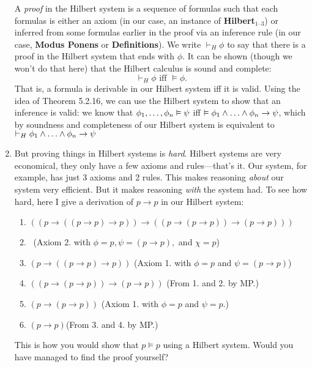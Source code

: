 \begin{enumerate}[\thesection.1]
\begin{description}
		\end{description}
	A \emph{proof} in the Hilbert system is a sequence of formulas such that each formulas is either an axiom (in our case, an instance of \textbf{Hilbert}$_\text{1--3}$) or inferred from some formulas earlier in the proof via an inference rule (in our case, \textbf{Modus Ponens}  or \textbf{Definitions}). We write $\vdash_H\phi$ to say that there is a proof in the Hilbert system that ends with $\phi$. It can be shown (though we won't do that here) that the Hilbert calculus is sound and complete:
	 \[\vdash_H\phi\text{ iff }\vDash\phi.\]
	 That is, a formula is derivable in our Hilbert system iff it is valid. Using the idea of Theorem 5.2.16, we can use the Hilbert system to show that an inference is valid: we know that $\phi_1, \mathellipsis,\phi_n\vDash \psi$ iff $\vDash \phi_1\land \mathellipsis\land \phi_n\to\psi$, which by soundness and completeness of our Hilbert system is equivalent to $\vdash_H \phi_1\land \mathellipsis\land \phi_n\to\psi$
	 
	 \item But proving things in Hilbert systems is \emph{hard}. Hilbert systems are very economical, they only have a few axioms and rules---that's it. Our system, for example, has just 3 axioms and 2 rules. This makes reasoning \emph{about} our system very efficient. But it makes reasoning \emph{with} the system had. To see how hard, here I give a derivation of $p\to p$ in our Hilbert system:
	\begin{enumerate}[1.] 

	\item $((p \to ((p \to p) \to p)) \to ((p \to (p \to p)) \to (p \to p)))$ 

	\item[] \ \hfill (Axiom 2. with $\phi=p, \psi=(p\to p),$ and $\chi=p$)

	\item $(p \to ((p \to p) \to p))$ \hfill (Axiom 1. with $\phi=p$ and $\psi=(p\to p)$)

	\item $((p \to (p \to p)) \to (p \to p))$ \hfill (From 1. and 2. by MP.)

	\item $(p \to (p \to p))$ \hfill (Axiom 1. with $\phi=p$ and $\psi=p$.)

	\item $(p \to p)$\hfill (From 3. and 4. by MP.)

\end{enumerate}
This is how you would show that $p\vDash p$ using a Hilbert system. Would you have managed to find the proof yourself?
	

\end{enumerate}
